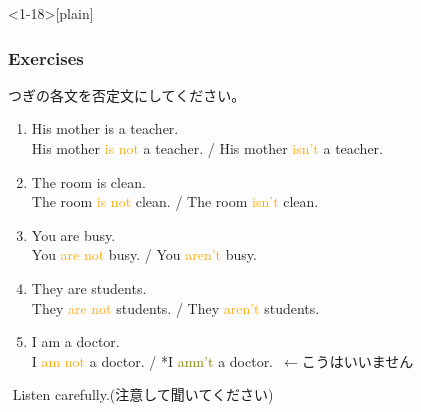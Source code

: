 \documentclass[aspectratio=169,xcolor={dvipsnames,table}]{beamer}
\newcommand{\myaudio}[1]{\href{#1}{\faVolumeUp}}
\begin{document}
\begin{frame}<1-18>[plain]\frametitle{Exercises}
つぎの各文を否定文にしてください。


  \begin{enumerate}
   \item His mother is a teacher.\\
         \pause
         His mother \textcolor{orange}{is not} a teacher. \pause{}/ His mother \textcolor{orange}{isn't} a teacher.\pause
   \item The room is clean.\\
         \pause
         The room \textcolor{orange}{is not} clean. \pause{}/ The room \textcolor{orange}{isn't} clean.\pause
   \item You are busy.\\
         \pause
         You \textcolor{orange}{are not} busy. \pause{}/ You \textcolor{orange}{aren't} busy.\pause
   \item They are students.\\
         \pause
         They \textcolor{orange}{are not} students. \pause{}/ They \textcolor{orange}{aren't} students.
   \item I am a doctor.\\
         \pause
         I \textcolor{orange}{am not} a doctor. \pause{} / *I \textcolor{olive}{amn't} a doctor.\,\,\,{}$\longleftarrow$こうはいいません\pause
  \end{enumerate}



\myaudio{audio/006_negative_be_04.mp3}\,\,{}Listen carefully.(注意して聞いてください)
\end{frame}
\end{document}
